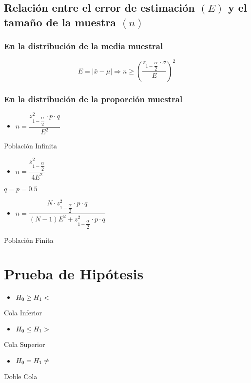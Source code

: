 \documentclass[10pt,letterpaper]{article}
\begin{document}
\subsection{Relación entre el error de estimación $(E)$ y el tamaño de la muestra $(n)$}
\subsubsection{En la distribución de la media muestral}
$$
E = |\bar{x}-\mu| \Rightarrow n \geq \left( \dfrac{z_{1-\dfrac{\alpha}{2}}\cdot\sigma}{E}\right)^2$$
\subsubsection{En la distribución de la proporción muestral}
\begin{multicols}{3}
\begin{itemize}
\item $n=\dfrac{z_{1-\dfrac{\alpha}{2}}^2\cdot p\cdot q}{E^2}$
\end{itemize}
Población Infinita
\columnbreak
\begin{itemize}
\item $n=\dfrac{z_{1-\dfrac{\alpha}{2}}^2}{4E^2}$
\end{itemize}
$q = p = 0.5 $
\columnbreak
\begin{itemize}
\item $n=\dfrac{N\cdot z_{1-\dfrac{\alpha}{2}}^2 \cdot p\cdot q}{(N-1)E^2 + z_{1-\dfrac{\alpha}{2}}^2 \cdot p\cdot q}$
\end{itemize}
Población Finita
\end{multicols}
\section{Prueba de Hipótesis}
\begin{multicols}{3}
\begin{itemize}
\item $H_0\geq \\ H_1 <$
\end{itemize}
Cola Inferior
\columnbreak
\begin{itemize}
\item $H_0\leq \\ H_1 >$
\end{itemize}
Cola Superior
\columnbreak
\begin{itemize}
\item $H_0= \\ H_1 \neq $
\end{itemize}
Doble Cola
\end{multicols}
\end{document}
